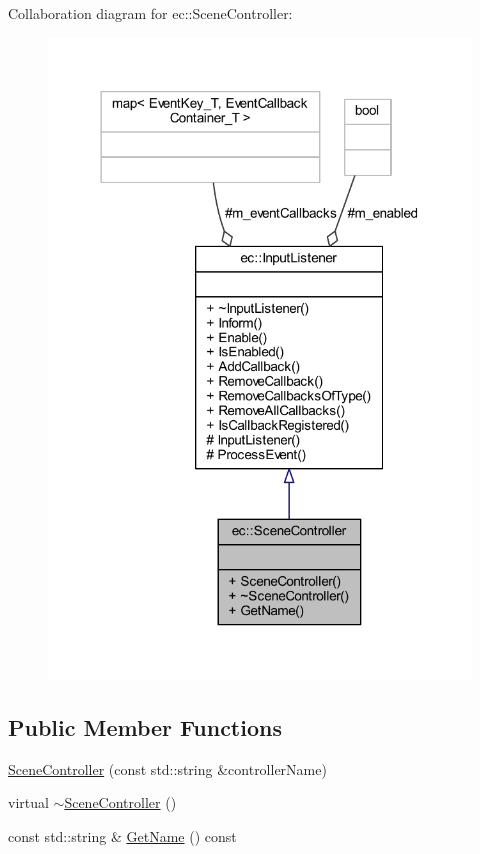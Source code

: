 Collaboration diagram for ec\+:\+:Scene\+Controller\+:
\nopagebreak
\begin{figure}[H]
\begin{center}
\leavevmode
\includegraphics[width=318pt]{classec_1_1_scene_controller__coll__graph}
\end{center}
\end{figure}
\subsection*{Public Member Functions}
\begin{DoxyCompactItemize}
\item 
\mbox{\hyperlink{classec_1_1_scene_controller_a19e5dd5ff2444f2bebc77c3946b7b5d5}{Scene\+Controller}} (const std\+::string \&controller\+Name)
\item 
virtual \mbox{\hyperlink{classec_1_1_scene_controller_a48a2231bf316949cc1a8bc304ad5281c}{$\sim$\+Scene\+Controller}} ()
\item 
const std\+::string \& \mbox{\hyperlink{classec_1_1_scene_controller_a4070fc0427eb34b86b1b46e37515495a}{Get\+Name}} () const
\end{DoxyCompactItemize}
